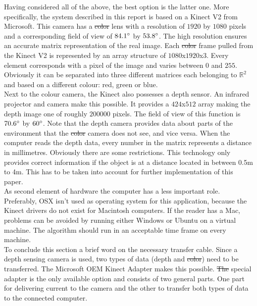 \documentclass{article}
\providecommand{\DIFaddtex}[1]{{\protect\color{blue}\uwave{#1}}} %
\providecommand{\DIFdeltex}[1]{{\protect\color{red}\sout{#1}}}                      %
\providecommand{\DIFaddbegin}{} %
\providecommand{\DIFaddend}{} %
\providecommand{\DIFdelbegin}{} %
\providecommand{\DIFdelend}{} %
\providecommand{\DIFadd}[1]{\texorpdfstring{\DIFaddtex{#1}}{#1}} %
\providecommand{\DIFdel}[1]{\texorpdfstring{\DIFdeltex{#1}}{}} %
\newcommand{\DIFscaledelfig}{0.5}
\newlength{\DIFdelgraphicswidth} %
\newlength{\DIFdelgraphicsheight} %
\newcommand{\DIFaddincludegraphics}[2][]{{\color{blue}\fbox{\DIFOincludegraphics[#1]{#2}}}} %
\newcommand{\DIFdelincludegraphics}[2][]{%
\sbox{\DIFdelgraphicsbox}{\DIFOincludegraphics[#1]{#2}}%
\settoboxwidth{\DIFdelgraphicswidth}{\DIFdelgraphicsbox} %
\settoboxtotalheight{\DIFdelgraphicsheight}{\DIFdelgraphicsbox} %
\scalebox{\DIFscaledelfig}{%
\parbox[b]{\DIFdelgraphicswidth}{\usebox{\DIFdelgraphicsbox}\\[-\baselineskip] \rule{\DIFdelgraphicswidth}{0em}}\llap{\resizebox{\DIFdelgraphicswidth}{\DIFdelgraphicsheight}{%
\setlength{\unitlength}{\DIFdelgraphicswidth}%
\begin{picture}(1,1)%
\thicklines\linethickness{2pt} %
{\color[rgb]{1,0,0}\put(0,0){\framebox(1,1){}}}%
{\color[rgb]{1,0,0}\put(0,0){\line( 1,1){1}}}%
{\color[rgb]{1,0,0}\put(0,1){\line(1,-1){1}}}%
\end{picture}%
}\hspace*{3pt}}} %
} %
\DeclareRobustCommand{\DIFaddbegin}{\DIFOaddbegin \let\includegraphics\DIFaddincludegraphics} %
\DeclareRobustCommand{\DIFaddend}{\DIFOaddend \let\includegraphics\DIFOincludegraphics} %
\DeclareRobustCommand{\DIFdelbegin}{\DIFOdelbegin \let\includegraphics\DIFdelincludegraphics} %
\DeclareRobustCommand{\DIFdelend}{\DIFOaddend \let\includegraphics\DIFOincludegraphics} %
\begin{document}
Having considered all of the above, the best option is the latter one. More specifically, the system described in this report is based on a Kinect V2 from Microsoft. This camera has a \DIFdelbegin \DIFdel{color }\DIFdelend \DIFaddbegin \DIFadd{colour }\DIFaddend lens with a resolution of $1920$ by $1080$ pixels and a corresponding field of view of $84.1\degree$ by $53.8\degree$\cite{kinect_specifications}. The high resolution ensures an accurate matrix representation of the real image. Each \DIFdelbegin \DIFdel{color }\DIFdelend \DIFaddbegin \DIFadd{colour }\DIFaddend frame pulled from the Kinect V2 is represented by an array structure of $1080$x$1920$x$3$. Every element corresponds with a pixel of the image and varies between $0$ and $255$. Obviously it can be separated into three different matrices each belonging to $\mathbb{R}^{2}$ and based on a different colour: red, green or blue.\\ Next to the colour camera, the Kinect also possesses a depth sensor. An infrared projector and camera make this possible\cite{kinect_v2}. It provides a $424$x$512$ array making the depth image one of roughly $200 000$ pixels. The field of view of this function is $70.6\degree$ by $60\degree$. Note that the depth camera provides data about parts of the environment that the \DIFdelbegin \DIFdel{color }\DIFdelend \DIFaddbegin \DIFadd{colour }\DIFaddend camera does not see, and vice versa. When the computer reads the depth data, every number in the matrix represents a distance in millimetres. Obviously there are some restrictions. This technology only provides correct information if the object is at a distance located in between 0.5m to 4m. This has to be taken into account for further implementation of this paper.\\
As second element of hardware the computer has a less important role. Preferably, OSX isn't used as operating system for this application, because the Kinect drivers do not exist for Macintosh computers. If the reader has a Mac, problems can be avoided by running either Windows or Ubuntu on a virtual machine. The algorithm should run in an acceptable time frame on every machine.\\
To conclude this section a brief word on the necessary transfer cable. Since a depth sensing camera is used, two types of data (depth and \DIFdelbegin \DIFdel{color}\DIFdelend \DIFaddbegin \DIFadd{colour}\DIFaddend ) need to be transferred. The Microsoft OEM Kinect Adapter makes this possible. \DIFdelbegin \DIFdel{The }\DIFdelend \DIFaddbegin \DIFadd{This }\DIFaddend special adapter is the only available option and consists of two general parts. One part for delivering current to the camera and the other to transfer both types of data to the connected computer.
\end{document}
